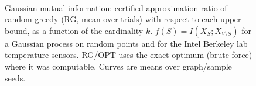 \begin{figure}[t]
\centering
\setlength{\rgplotwidth}{0.245\textwidth}
\\[1pt]
\hfill
\hfill

\caption{Gaussian mutual information: certified approximation ratio of random greedy (RG, mean over trials) with respect to each upper bound, as a function of the cardinality $k$. $f(S)=I(X_S;X_{V\setminus S})$ for a Gaussian process on random points and for the Intel Berkeley lab temperature sensors. RG/OPT uses the exact optimum (brute force) where it was computable. Curves are means over graph/sample seeds.}
\label{fig:rg-gaussian_mi-wide}
\end{figure}

